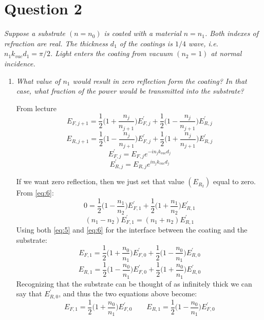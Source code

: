 \documentclass[12pt]{article}
\begin{document}
\section*{Question 2}
{\sl Suppose a substrate $(n=n_0)$ is coated with a material $n=n_1$. Both indexes of refraction are real. The thickness $d_1$ of the coatings is $1/4$ wave, i.e. $n_1k_{vac}d_1 = \pi/2$. Light enters the coating from vacuum $(n_2 = 1)$ at normal incidence.}
\begin{enumerate}[label=\alph*)]
\item {\sl What value of $n_1$ would result in zero reflection form the coating? In that case, what fraction of the power would be transmitted into the substrate?}

From lecture 
\begin{equation}
	\tag{Equation 5}
	E_{F,j+1} = \frac{1}{2}\Big(1 + \frac{n_j}{n_{j+1}}\Big)E^\prime_{F,j} + \frac{1}{2}\Big(1 - \frac{n_j}{n_{j+1}}\Big)E^\prime_{R,j}
	\label{eq:5}
\end{equation}
\begin{equation}
	\tag{Equation 6}
	E_{R,j+1} = \frac{1}{2}\Big(1 - \frac{n_j}{n_{j+1}}\Big)E^\prime_{F,j} + \frac{1}{2}\Big(1 + \frac{n_j}{n_{j+1}}\Big)E^\prime_{R,j}
	\label{eq:6}
\end{equation}
\begin{equation}
	\tag{Equation 7}
	E^\prime_{F,j} = E_{F,j}e^{-in_jk_{vac}d_j}
	\label{eq:7}
\end{equation}
\begin{equation}
	\tag{Equation 8}
	E^\prime_{R,j} = E_{R,j}e^{in_jk_{vac}d_j}
	\label{eq:8}
\end{equation}

If we want zero reflection, then we just set that value $(E_{R_2})$ equal to zero. From \ref{eq:6}:
\[0 = \frac{1}{2}\Big(1 - \frac{n_1}{n_{2}}\Big)E^\prime_{F,1} + \frac{1}{2}\Big(1 + \frac{n_1}{n_{2}}\Big)E^\prime_{R,1}\]
\begin{equation}
(n_1 - n_2)E^\prime_{F,1} = (n_1 + n_2)E^\prime_{R,1}
\label{eq:a}
\end{equation}
Using both \ref{eq:5} and \ref{eq:6} for the interface between the coating and the substrate:
\[E_{F,1} = \frac{1}{2}\Big(1 + \frac{n_0}{n_1}\Big)E^\prime_{F,0} + \frac{1}{2}\Big(1- \frac{n_0}{n_1}\Big)E^\prime_{R,0}\]
\[E_{R,1} = \frac{1}{2}\Big(1 - \frac{n_0}{n_1}\Big)E^\prime_{F,0} + \frac{1}{2}\Big(1+\frac{n_0}{n_1}\Big)E^\prime_{R,0}\]
Recognizing that the substrate can be thought of as infinitely thick we can say that $E^\prime_{R,0}$, and thus the two equations above become:
\[E_{F,1} = \frac{1}{2}\Big(1 + \frac{n_0}{n_1}\Big)E^\prime_{F,0} \qquad E_{R,1} = \frac{1}{2}\Big(1 - \frac{n_0}{n_1}\Big)E^\prime_{F,0}\]\smallskip


\end{enumerate}
\end{document}
